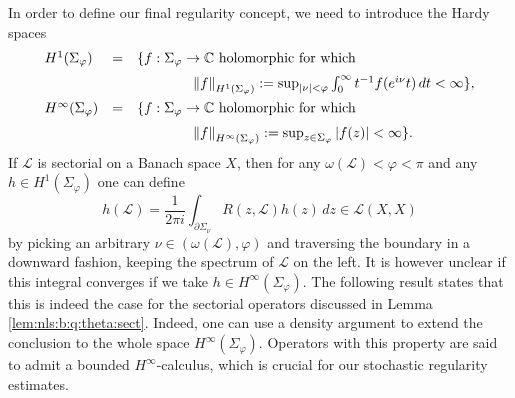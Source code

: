 \documentclass[10pt]{articleHJ}
\newcommand{\abs}[1]{\left\vert#1\right\vert}			%
\newcommand{\norm}[1]{\left\Vert#1\right\Vert}		%
\numberwithin{equation}{section}
\begin{document}
In order to define our final regularity concept,
we need to introduce the Hardy spaces
\begin{equation}
\begin{array}{lcl}
H^1(\Sigma_{\varphi} )
 & = & \{f: \Sigma_{\varphi} \to \mathbb{C} \hbox{ holomorphic for which }
\\[0.2cm]
& & \qquad \qquad
 \norm{f}_{H^1(\Sigma_{\varphi})}
  := \sup_{\abs{\nu} < \varphi }
      \int_0^\infty t^{-1} f( e^{i \nu} t ) \, dt < \infty \},
\\[0.2cm]
%
H^\infty(\Sigma_{\varphi} )
 & = & \{f: \Sigma_{\varphi} \to \mathbb{C} \hbox{ holomorphic for which }
\\[0.2cm]
& & \qquad \qquad
 \norm{f}_{H^\infty(\Sigma_{\varphi})} :=
   \sup_{z \in \Sigma_{\varphi} } \abs{f(z)} < \infty \} .
%
\end{array}
\end{equation}
If $\mathcal{L}$ is sectorial on a Banach space $X$,
then
for any $\omega(\mathcal{L}) < \varphi < \pi$
and any $h \in H^1(\Sigma_{\varphi})$ one can define
\begin{equation}
h(\mathcal{L}) = \frac{1}{2 \pi i}
  \int_{\partial \Sigma_{\nu} } R(z , \mathcal{L} ) h(z) \, dz
  \in \mathcal{L}(X, X)
\end{equation}
by picking an arbitrary $\nu \in (\omega(\mathcal{L}) , \varphi )$
and traversing the boundary in a downward fashion,
keeping the spectrum of $\mathcal{L}$ on the left.
It is however unclear if this integral converges
if we take $h \in  H^\infty(\Sigma_{\varphi})$.
The following result
states that this is indeed the case
for the sectorial operators discussed in
Lemma \ref{lem:nls:b:q:theta:sect}. Indeed, one can use a density argument to extend the conclusion 
to the whole space $H^\infty(\Sigma_{\varphi})$. 
Operators with this property
are said to admit a bounded $H^\infty$-calculus,
which is crucial for our
stochastic regularity estimates.
\end{document}
